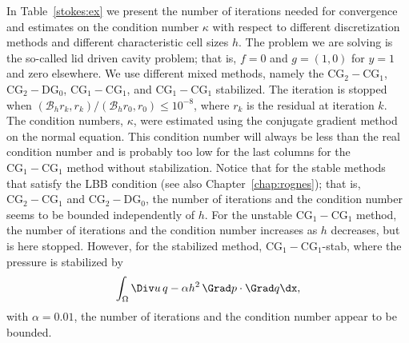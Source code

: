 In Table~\ref{stokes:ex} we present the number of iterations needed
for convergence and estimates on the condition number $\kappa$ with
respect to different discretization methods and different
characteristic cell sizes $h$. The problem we are solving is the
so-called lid driven cavity problem; that is, $f=0$ and $g = (1,0)$ for
$y=1$ and zero elsewhere.  We use different mixed methods, namely the
$\mathrm{CG}_2-\mathrm{CG}_1$, $\mathrm{CG}_2-\mathrm{DG}_0$,
$\mathrm{CG}_1-\mathrm{CG}_1$, and $\mathrm{CG}_1-\mathrm{CG}_1$
stabilized.  The iteration is stopped when $(\mathcal{B}_h r_k,
r_k)/(\mathcal{B}_h r_0, r_0) \le 10^{-8}$, where $r_k$ is the
residual at iteration $k$.  The condition numbers, $\kappa$, were
estimated using the conjugate gradient method on the normal
equation. This condition number will always be less than the real
condition number and is probably too low for the last columns for the
$\mathrm{CG}_1-\mathrm{CG}_1$ method without stabilization.
Notice that for the stable methods that satisfy the
LBB condition (see also Chapter~\ref{chap:rognes}); that is,
 $\mathrm{CG}_2-\mathrm{CG}_1$
and $\mathrm{CG}_2-\mathrm{DG}_0$, the number of iterations and the
condition number seems to be bounded independently of $h$. For the
unstable $\mathrm{CG}_1-\mathrm{CG}_1$ method, the number of
iterations and the condition number increases as $h$
decreases, but is here stopped. However, for the stabilized method,
$\mathrm{CG}_1-\mathrm{CG}_1$-stab, where the pressure is stabilized
by
\[
\int_\Omega \Div u \, q  - \alpha h^2 \, \Grad p \cdot \Grad q
    \dx,
\]
with $\alpha=0.01$, the number of iterations and the condition number appear to be bounded.

